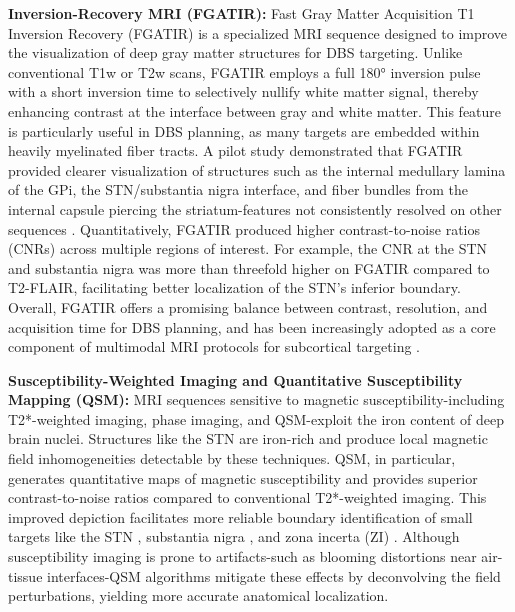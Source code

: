 \textbf{Inversion-Recovery MRI (FGATIR):}  
Fast Gray Matter Acquisition T1 Inversion Recovery (FGATIR) is a specialized MRI sequence designed to improve the visualization of deep gray matter structures for DBS targeting. Unlike conventional T1w or T2w scans, FGATIR employs a full 180° inversion pulse with a short inversion time to selectively nullify white matter signal, thereby enhancing contrast at the interface between gray and white matter. This feature is particularly useful in DBS planning, as many targets are embedded within heavily myelinated fiber tracts. A pilot study demonstrated that FGATIR provided clearer visualization of structures such as the internal medullary lamina of the GPi, the STN/substantia nigra interface, and fiber bundles from the internal capsule piercing the striatum-features not consistently resolved on other sequences \cite{Sudhyadhom2009-xx}. Quantitatively, FGATIR produced higher contrast-to-noise ratios (CNRs) across multiple regions of interest. For example, the CNR at the STN and substantia nigra was more than threefold higher on FGATIR compared to T2-FLAIR, facilitating better localization of the STN's inferior boundary. Overall, FGATIR offers a promising balance between contrast, resolution, and acquisition time for DBS planning, and has been increasingly adopted as a core component of multimodal MRI protocols for subcortical targeting \cite{Neudorfer2022-nj}.


\textbf{Susceptibility-Weighted Imaging and Quantitative Susceptibility Mapping (QSM):} MRI sequences sensitive to magnetic susceptibility-including T2*-weighted imaging, phase imaging, and QSM-exploit the iron content of deep brain nuclei. Structures like the STN are iron-rich and produce local magnetic field inhomogeneities detectable by these techniques. QSM, in particular, generates quantitative maps of magnetic susceptibility and provides superior contrast-to-noise ratios compared to conventional T2*-weighted imaging. This improved depiction facilitates more reliable boundary identification of small targets like the STN \cite{Liu2013-zm}, substantia nigra \cite{Chen2021-tj}, and zona incerta (ZI) \cite{Lau2020-dh} . Although susceptibility imaging is prone to artifacts-such as blooming distortions near air-tissue interfaces-QSM algorithms mitigate these effects by deconvolving the field perturbations, yielding more accurate anatomical localization.

